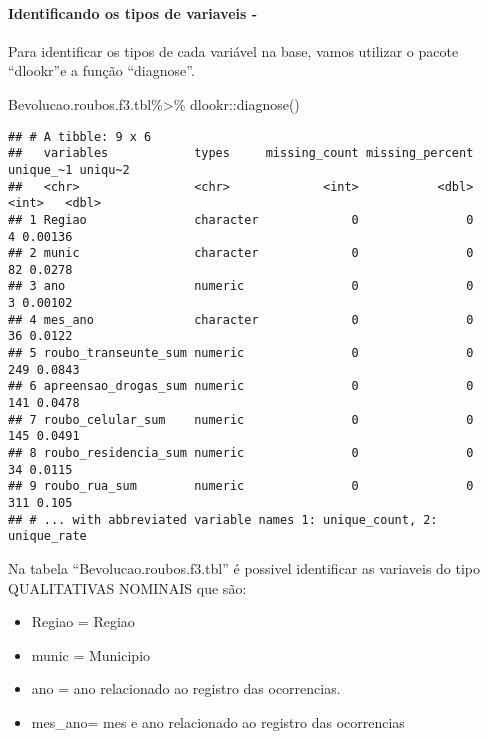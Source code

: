 \documentclass[
]{article}
\newenvironment{Shaded}{\begin{snugshade}}{\end{snugshade}}
\newcommand{\FunctionTok}[1]{\textcolor[rgb]{0.00,0.00,0.00}{#1}}
\newcommand{\NormalTok}[1]{#1}
\newcommand{\SpecialCharTok}[1]{\textcolor[rgb]{0.00,0.00,0.00}{#1}}
\providecommand{\tightlist}{%
  \setlength{\itemsep}{0pt}\setlength{\parskip}{0pt}}
\begin{document}
\hypertarget{identificando-os-tipos-de-variaveis--}{%
\paragraph{Identificando os tipos de variaveis -}\label{identificando-os-tipos-de-variaveis--}}

Para identificar os tipos de cada variável na base, vamos utilizar o pacote ``dlookr''e a função ``diagnose''.

\begin{Shaded}
\begin{Highlighting}[]
\NormalTok{Bevolucao.roubos.f3.tbl}\SpecialCharTok{\%\textgreater{}\%}\NormalTok{ dlookr}\SpecialCharTok{::}\FunctionTok{diagnose}\NormalTok{()}
\end{Highlighting}
\end{Shaded}

\begin{verbatim}
## # A tibble: 9 x 6
##   variables            types     missing_count missing_percent unique_~1 uniqu~2
##   <chr>                <chr>             <int>           <dbl>     <int>   <dbl>
## 1 Regiao               character             0               0         4 0.00136
## 2 munic                character             0               0        82 0.0278 
## 3 ano                  numeric               0               0         3 0.00102
## 4 mes_ano              character             0               0        36 0.0122 
## 5 roubo_transeunte_sum numeric               0               0       249 0.0843 
## 6 apreensao_drogas_sum numeric               0               0       141 0.0478 
## 7 roubo_celular_sum    numeric               0               0       145 0.0491 
## 8 roubo_residencia_sum numeric               0               0        34 0.0115 
## 9 roubo_rua_sum        numeric               0               0       311 0.105  
## # ... with abbreviated variable names 1: unique_count, 2: unique_rate
\end{verbatim}

Na tabela ``Bevolucao.roubos.f3.tbl'' é possivel identificar as variaveis do tipo QUALITATIVAS NOMINAIS que são:

\begin{itemize}
\tightlist
\item
  Regiao = Regiao
\item
  munic = Municipio
\item
  ano = ano relacionado ao registro das ocorrencias.
\item
  mes\_ano= mes e ano relacionado ao registro das ocorrencias
\end{itemize}
\end{document}
